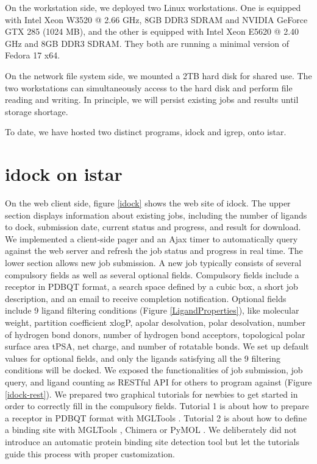 \documentclass[12pt]{article}
\begin{document}
On the workstation side, we deployed two Linux workstations. One is equipped with Intel Xeon W3520 @ 2.66 GHz, 8GB DDR3 SDRAM and NVIDIA GeForce GTX 285 (1024 MB), and the other is equipped with Intel Xeon E5620 @ 2.40 GHz and 8GB DDR3 SDRAM. They both are running a minimal version of Fedora 17 x64.

On the network file system side, we mounted a 2TB hard disk for shared use. The two workstations can simultaneously access to the hard disk and perform file reading and writing. In principle, we will persist existing jobs and results until storage shortage.

To date, we have hosted two distinct programs, idock and igrep, onto istar.

\section*{\sffamily \Large idock on istar}

On the web client side, figure \ref{idock} shows the web site of idock. The upper section displays information about existing jobs, including the number of ligands to dock, submission date, current status and progress, and result for download. We implemented a client-side pager and an Ajax timer to automatically query against the web server and refresh the job status and progress in real time. The lower section allows new job submission. A new job typically consists of several compulsory fields as well as several optional fields. Compulsory fields include a receptor in PDBQT format, a search space defined by a cubic box, a short job description, and an email to receive completion notification. Optional fields include 9 ligand filtering conditions (Figure \ref{LigandProperties}), like molecular weight, partition coefficient xlogP, apolar desolvation, polar desolvation, number of hydrogen bond donors, number of hydrogen bond acceptors, topological polar surface area tPSA, net charge, and number of rotatable bonds. We set up default values for optional fields, and only the ligands satisfying all the 9 filtering conditions will be docked. We exposed the functionalities of job submission, job query, and ligand counting as RESTful API for others to program against (Figure \ref{idock-rest}). We prepared two graphical tutorials for newbies to get started in order to correctly fill in the compulsory fields. Tutorial 1 is about how to prepare a receptor in PDBQT format with MGLTools \citep{596}. Tutorial 2 is about how to define a binding site with MGLTools \citep{596}, Chimera \citep{1219} or PyMOL \citep{1221}. We deliberately did not introduce an automatic protein binding site detection tool but let the tutorials guide this process with proper customization.
\end{document}
